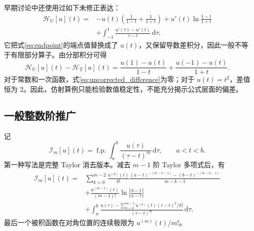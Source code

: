 \documentclass[UTF8,fontset=none,11pt,a4paper]{ctexart}
\newcommand{\HT}{\mathcal H_{\mathrm T}}
\newcommand{\HU}{\mathcal H_{\mathrm U}}
\begin{document}
早期讨论中还使用过如下未修正表达：
\begin{align}
\HU[u](t)={}&
-u(t)\left(\frac{1}{1-t}+\frac{1}{1+t}\right)
+u'(t)\ln\frac{1-t}{1+t}\nonumber\\
&+\int_{-1}^{1}
\frac{u'(\tau)-u'(t)}{\tau-t}\,\mathrm d\tau .
\label{eq:uncorrected}
\end{align}
它把式\eqref{eq:endpoint}的端点值替换成了 $u(t)$，又保留导数差积分，因此一般不等于有限部分算子。由分部积分可得
\begin{equation}
\HU[u](t)-\HT[u](t)
=\frac{u(1)-u(t)}{1-t}
+\frac{u(-1)-u(t)}{1+t}.
\label{eq:uncorrected_difference}
\end{equation}
对于常数和一次函数，式\eqref{eq:uncorrected_difference}为零；对于 $u(t)=t^2$，差值恒为 $2$。因此，仿射算例只能检验数值稳定性，不能充分揭示公式层面的偏差。

\subsection{一般整数阶推广}

记
\begin{equation}
\mathcal I_m[u](t)=\operatorname{f.p.}\!\int_a^b
\frac{u(\tau)}{(\tau-t)^m}\,\mathrm d\tau,
\qquad a<t<b.
\end{equation}
第一种写法是完整 Taylor 消去版本。减去 $m-1$ 阶 Taylor 多项式后，有
\begin{align}
\mathcal I_m[u](t)={}&
\sum_{k=0}^{m-2}\frac{u^{(k)}(t)}{k!}
\frac{(a-t)^{-(m-k-1)}-(b-t)^{-(m-k-1)}}{m-k-1}
\nonumber\\
&+\frac{u^{(m-1)}(t)}{(m-1)!}
\ln\left|\frac{b-t}{a-t}\right|\nonumber\\
&+\int_a^b
\frac{u(\tau)-\displaystyle\sum_{k=0}^{m-1}
u^{(k)}(t)(\tau-t)^k/k!}{(\tau-t)^m}\,\mathrm d\tau.
\label{eq:general_taylor}
\end{align}
最后一个被积函数在对角位置的连续极限为 $u^{(m)}(t)/m!$。
\end{document}
